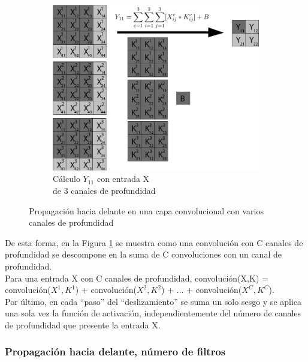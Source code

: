 \begin{figure}[H]
	\vspace{5mm}
	\begin{subfigure}{.5\textwidth}
		\hspace{-10mm}
		\includegraphics[width=1.2\linewidth]{imagenes/conv_1_3canales.jpg}  
		\caption{Cálculo $Y_{11}$ con entrada X \\ de 3 canales de profundidad}
	\end{subfigure}
	\caption{Propagación hacia delante en una capa convolucional con varios canales de profundidad}
	\label{fig:forward_prop_convolucional_canales_profundidad}
\end{figure}

De esta forma, en la Figura \ref{fig:forward_prop_convolucional_canales_profundidad} se muestra como una convolución con C canales de profundidad se descompone en la suma de C convoluciones con un canal de profundidad. \\ Para una entrada X con C canales de profundidad, convolución(X,K) = convolución($X^1,K^1$) + convolución($X^2,K^2$) + ... + convolución($X^C,K^C$). \\
Por último, en cada ``paso'' del ``deslizamiento'' se suma un solo sesgo y se aplica una sola vez la función de activación, independientemente del número de canales de profundidad que presente la entrada X.

\subsubsection{Propagación hacia delante, número de filtros}


